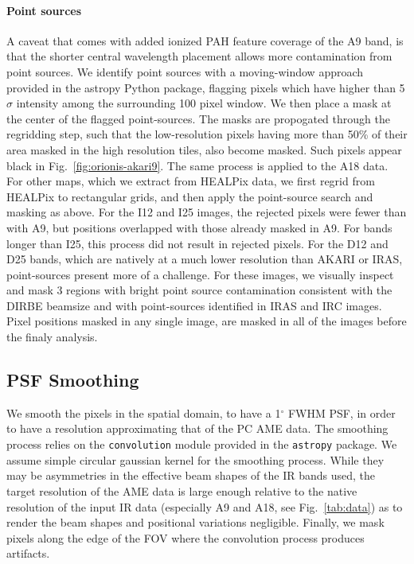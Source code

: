         \paragraph{Point sources}
          A caveat that comes with added ionized PAH feature coverage of the A9 band, is that the shorter central wavelength placement allows more contamination from point sources. We identify point sources with a moving-window approach provided in the astropy Python package, flagging pixels which have higher than 5$\sigma$ intensity among the surrounding 100 pixel window. We then place a mask at the center of the flagged point-sources. The masks are propogated through the regridding step, such that the low-resolution pixels having more than 50\% of their area masked in the high resolution tiles, also become masked. Such pixels appear black in Fig.~\ref{fig:orionis-akari9}. The same process is applied to the A18 data. For other maps, which we extract from HEALPix data, we first regrid from HEALPix to rectangular grids, and then apply the point-source search and masking as above. For the I12 and I25 images, the rejected pixels were fewer than with A9, but positions overlapped with those already masked in A9. For bands longer than I25, this process did not result in rejected pixels. For the D12 and D25 bands, which are natively at a much lower resolution than AKARI or IRAS, point-sources present more of a challenge. For these images, we visually inspect and mask 3 regions with bright point source contamination consistent with the DIRBE beamsize and with point-sources identified in IRAS and IRC images. Pixel positions masked in any single image, are masked in all of the images before the finaly analysis.


        \subsection{PSF Smoothing}
          We smooth the pixels in the spatial domain, to have a 1$^{\circ}$ FWHM PSF, in order to have a resolution approximating that of the PC AME data.
          The smoothing process relies on the {\tt convolution} module provided in the {\tt astropy} package. We assume simple circular gaussian kernel for the smoothing process. While they may be asymmetries in the effective beam shapes of the IR bands used, the target resolution of the AME data is large enough relative to the native resolution of the input IR data (especially A9 and A18, see Fig.~\ref{tab:data}) as to render the beam shapes and positional variations negligible. Finally, we mask pixels along the edge of the FOV where the convolution process produces artifacts.

